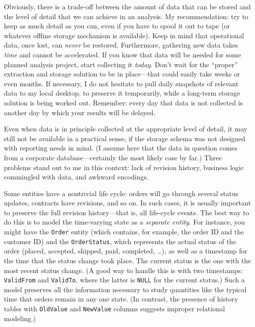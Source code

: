 Obviously, there is a trade-off between the amount of data that can be
stored and the level of detail that we can achieve in an analysis. My
recommendation: try to keep as much detail as you can, even if you
have to spool it out to tape (or whatever offline storage mechanism is
available). Keep in mind that operational data, once lost, can
\emph{never} be restored. Furthermore, gathering new data takes
\emph{time} and cannot be accelerated.  If you know that data will be
needed for some planned analysis project, start collecting it
\emph{today}. Don't wait for the ``proper'' extraction and storage
solution to be in place---that could easily take weeks or even months.
If necessary, I do not hesitate to pull daily snapshots of relevant
data to my local desktop, to preserve it temporarily, while a
long-term storage solution is being worked out. Remember: every day
that data is not collected is another day by which your results will
be delayed.
    
Even when data is in principle collected at the appropriate level of
detail, it may still not be available in a practical sense, if the
storage schema was not designed with reporting needs in mind. (I
assume here that the data in question comes from a corporate
database---certainly the most likely case by far.)  Three problems
stand out to me in this context: lack of revision history, business
logic commingled with data, and awkward encodings.
    
Some entities have a nontrivial life cycle: orders will go through
several status updates, contracts have revisions, and so on. In such
cases, it is usually important to preserve the full revision
history---that is, all life-cycle events. The best way to do this is
to model the time-varying state as a \emph{separate entity}. For
instance, you might have the \texttt{Order} entity (which contains,
for example, the order ID and the customer ID) and the \texttt{OrderStatus},
which represents the actual status of the order (placed, accepted,
shipped, paid, completed, \dots), as well as a timestamp for the time
that the status change took place. The current status is the one with
the most recent status change. (A good way to handle this is with two
timestamps: \texttt{ValidFrom} and \texttt{ValidTo}, where the latter
is \texttt{NULL} for the current status.)  Such a model preserves all
the information necessary to study quantities like the typical time
that orders remain in any one state. (In contrast, the presence of
history tables with \texttt{OldValue} and \texttt{NewValue} columns
suggests improper relational modeling.)
    
